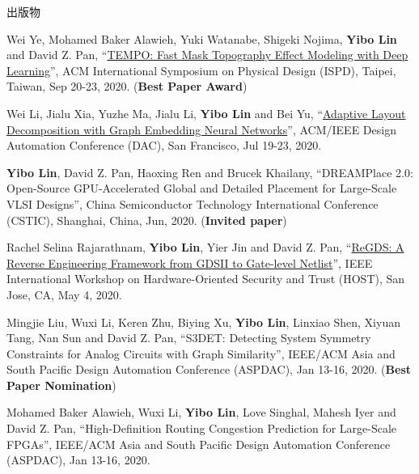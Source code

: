 \begin{rSection}{出版物}
\begin{description}[font=\normalfont]
\item[{[C39]}]{
        Wei Ye, Mohamed Baker Alawieh, Yuki Watanabe, Shigeki Nojima, \textbf{Yibo Lin} and David Z. Pan, 
    ``\href{https://doi.org/10.1145/3372780.3375565}{TEMPO: Fast Mask Topography Effect Modeling with Deep Learning}'', 
    ACM International Symposium on Physical Design (ISPD), Taipei, Taiwan, Sep 20-23, 2020.
    (\textbf{Best Paper Award})
}
            

\item[{[C38]}]{
        Wei Li, Jialu Xia, Yuzhe Ma, Jialu Li, \textbf{Yibo Lin} and Bei Yu, 
    ``\href{https://doi.org/10.1109/DAC18072.2020.9218706}{Adaptive Layout Decomposition with Graph Embedding Neural Networks}'', 
    ACM/IEEE Design Automation Conference (DAC), San Francisco, Jul 19-23, 2020.
    
}
            

\item[{[C37]}]{
        \textbf{Yibo Lin}, David Z. Pan, Haoxing Ren and Brucek Khailany, 
    ``DREAMPlace 2.0: Open-Source GPU-Accelerated Global and Detailed Placement for Large-Scale VLSI Designs'', 
    China Semiconductor Technology International Conference (CSTIC), Shanghai, China, Jun, 2020.
    (\textbf{Invited paper})
}
            

\item[{[C36]}]{
        Rachel Selina Rajarathnam, \textbf{Yibo Lin}, Yier Jin and David Z. Pan, 
    ``\href{https://doi.org/10.1109/HOST45689.2020.9300272}{ReGDS: A Reverse Engineering Framework from GDSII to Gate-level Netlist}'', 
    IEEE International Workshop on Hardware-Oriented Security and Trust (HOST), San Jose, CA, May 4, 2020.
    
}
            

\item[{[C35]}]{
        Mingjie Liu, Wuxi Li, Keren Zhu, Biying Xu, \textbf{Yibo Lin}, Linxiao Shen, Xiyuan Tang, Nan Sun and David Z. Pan, 
    ``S3DET: Detecting System Symmetry Constraints for Analog Circuits with Graph Similarity'', 
    IEEE/ACM Asia and South Pacific Design Automation Conference (ASPDAC), Jan 13-16, 2020.
    (\textbf{Best Paper Nomination})
}
            

\item[{[C34]}]{
        Mohamed Baker Alawieh, Wuxi Li, \textbf{Yibo Lin}, Love Singhal, Mahesh Iyer and David Z. Pan, 
    ``High-Definition Routing Congestion Prediction for Large-Scale FPGAs'', 
    IEEE/ACM Asia and South Pacific Design Automation Conference (ASPDAC), Jan 13-16, 2020.
    
}
\end{description}
\end{rSection}

